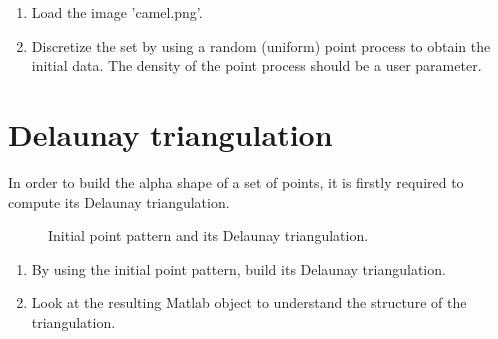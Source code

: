 \begin{qbox}
\begin{enumerate}
	\item Load the image 'camel.png'.
	\item Discretize the set by using a random (uniform) point process to obtain the initial data. The density of the point process should be a user parameter.
\end{enumerate}
\end{qbox}

\section{Delaunay triangulation}

In order to build the alpha shape of a set of points, it is firstly required to compute its Delaunay triangulation.
\begin{figure}[htbp]
\centering
{}\hspace{.5cm}
\hspace{.5cm}
\caption{Initial point pattern and its Delaunay triangulation.}
\label{fig:alphashapes:delaunay}
\end{figure}

\begin{qbox}
\begin{enumerate}
	\item By using the initial point pattern, build its Delaunay triangulation.
	\item Look at the resulting Matlab object to understand the structure of the triangulation.
\end{enumerate}
\end{qbox}


